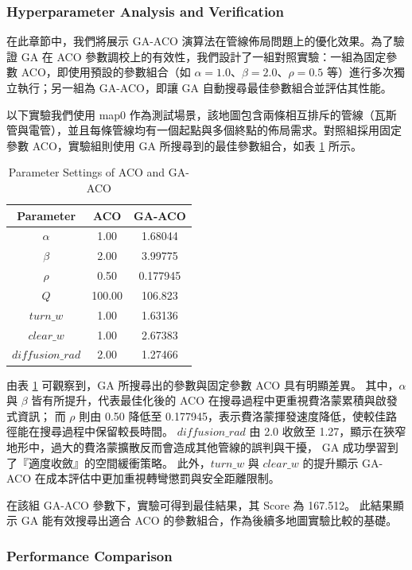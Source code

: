 \documentclass[conference]{IEEEtran}
\begin{document}
\subsubsection{Hyperparameter Analysis and Verification}

在此章節中，我們將展示 GA-ACO 演算法在管線佈局問題上的優化效果。為了驗證 GA 在 ACO 參數調校上的有效性，我們設計了一組對照實驗：一組為固定參數 ACO，即使用預設的參數組合（如 $\alpha=1.0$、$\beta=2.0$、$\rho=0.5$ 等）進行多次獨立執行；另一組為 GA-ACO，即讓 GA 自動搜尋最佳參數組合並評估其性能。

以下實驗我們使用 map0 作為測試場景，該地圖包含兩條相互排斥的管線（瓦斯管與電管），並且每條管線均有一個起點與多個終點的佈局需求。對照組採用固定參數 ACO，實驗組則使用 GA 所搜尋到的最佳參數組合，如表 \ref{tab:aco_params} 所示。

\begin{table}[!t]
\caption{Parameter Settings of ACO and GA-ACO}
\label{tab:aco_params}
\centering
\begin{tabular}{c c c}
\hline
Parameter & ACO & GA-ACO \\
\hline
$\alpha$ & 1.00 & 1.68044 \\
$\beta$ & 2.00 & 3.99775 \\
$\rho$ & 0.50 & 0.177945 \\
$Q$ & 100.00 & 106.823 \\
$turn\_w$ & 1.00 & 1.63136 \\
$clear\_w$ & 1.00 & 2.67383 \\
$diffusion\_rad$ & 2.00 & 1.27466 \\
\hline
\end{tabular}
\end{table}

由表 \ref{tab:aco_params} 可觀察到，GA 所搜尋出的參數與固定參數 ACO 具有明顯差異。
其中，$\alpha$ 與 $\beta$ 皆有所提升，代表最佳化後的 ACO 在搜尋過程中更重視費洛蒙累積與啟發式資訊；
而 $\rho$ 則由 0.50 降低至 0.177945，表示費洛蒙揮發速度降低，使較佳路徑能在搜尋過程中保留較長時間。
$diffusion\_rad$ 由 2.0 收斂至 1.27，顯示在狹窄地形中，過大的費洛蒙擴散反而會造成其他管線的誤判與干擾，
GA 成功學習到了『適度收斂』的空間緩衝策略。
此外，$turn\_w$ 與 $clear\_w$ 的提升顯示 GA-ACO 在成本評估中更加重視轉彎懲罰與安全距離限制。

在該組 GA-ACO 參數下，實驗可得到最佳結果，其 Score 為 167.512。
此結果顯示 GA 能有效搜尋出適合 ACO 的參數組合，作為後續多地圖實驗比較的基礎。

\subsubsection{Performance Comparison}
\end{document}
